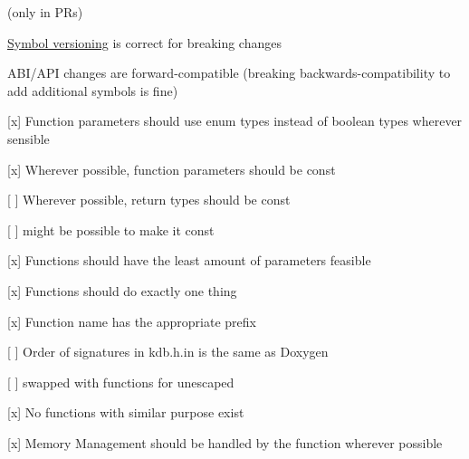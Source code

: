 {\ttfamily }

{\ttfamily  (only in P\+Rs)}

{\ttfamily 
\begin{DoxyItemize}
\item \hyperlink{doc_dev_symbol-versioning_md}{Symbol versioning} is correct for breaking changes
\item A\+B\+I/\+A\+PI changes are forward-\/compatible (breaking backwards-\/compatibility to add additional symbols is fine)
\end{DoxyItemize}}

{\ttfamily }

{\ttfamily 
\begin{DoxyItemize}
\item \mbox{[}x\mbox{]} Function parameters should use enum types instead of boolean types wherever sensible
\item \mbox{[}x\mbox{]} Wherever possible, function parameters should be {\ttfamily const}
\item \mbox{[} \mbox{]} Wherever possible, return types should be {\ttfamily const}
\begin{DoxyItemize}
\item \mbox{[} \mbox{]} might be possible to make it {\ttfamily const}
\end{DoxyItemize}
\item \mbox{[}x\mbox{]} Functions should have the least amount of parameters feasible
\end{DoxyItemize}}

{\ttfamily }

{\ttfamily 
\begin{DoxyItemize}
\item \mbox{[}x\mbox{]} Functions should do exactly one thing
\item \mbox{[}x\mbox{]} Function name has the appropriate prefix
\item \mbox{[} \mbox{]} Order of signatures in kdb.\+h.\+in is the same as Doxygen
\begin{DoxyItemize}
\item \mbox{[} \mbox{]} swapped with functions for unescaped
\end{DoxyItemize}
\item \mbox{[}x\mbox{]} No functions with similar purpose exist
\end{DoxyItemize}}

{\ttfamily }

{\ttfamily 
\begin{DoxyItemize}
\item \mbox{[}x\mbox{]} Memory Management should be handled by the function wherever possible
\end{DoxyItemize}}

